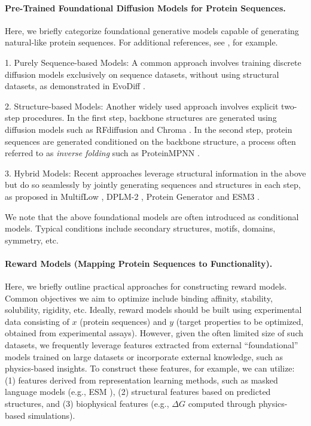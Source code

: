 \documentclass[12pt]{article} %
\begin{document}
{{\paragraph{Pre-Trained Foundational Diffusion Models for Protein Sequences.}


Here, we briefly categorize foundational generative models capable of generating natural-like protein sequences. For additional references, see \citet{winnifrith2024generative}, for example.


1. Purely Sequence-based Models: A common approach involves training discrete diffusion models exclusively on sequence datasets, without using structural datasets, as demonstrated in EvoDiff \citep{alamdari2023protein}. 

2. Structure-based Models: Another widely used approach involves explicit two-step procedures. In the first step, backbone structures are generated using diffusion models such as RFdiffusion \citep{watson2023novo} and Chroma \citep{ingraham2023illuminating}. In the second step, protein sequences are generated conditioned on the backbone structure, a process often referred to as \emph{inverse folding} such as ProteinMPNN \citep{dauparas2022robust}. 

3.  Hybrid Models: Recent approaches leverage structural information in the above but do so seamlessly by jointly generating sequences and structures in each step, as proposed in MultifLow \citep{campbell2024generative}, DPLM-2 \citep{wang2024dplm}, Protein Generator \citep{lisanza2023joint} and ESM3 \citep{hayes2024simulating}. 


We note that the above foundational models are often introduced as conditional models. Typical conditions include secondary structures, motifs, domains,  symmetry, etc. 
 

\paragraph{Reward Models (Mapping Protein Sequences to Functionality).}

Here, we briefly outline practical approaches for constructing reward models. Common objectives we aim to optimize include binding affinity, stability, solubility, rigidity, etc. Ideally, reward models should be built using experimental data consisting of $x$ (protein sequences) and $y$ (target properties to be optimized, obtained from experimental assays). However, given the often limited size of such datasets, we frequently leverage features extracted from external ``foundational'' models trained on large datasets or incorporate external knowledge, such as physics-based insights. To construct these features, for example, we can utilize: (1) features derived from representation learning methods, such as masked language models (e.g., ESM \citep{hayes2024simulating}), (2) structural features based on predicted structures, and (3) biophysical features (e.g., $\Delta G$ computed through physics-based simulations).

}}
\end{document}

